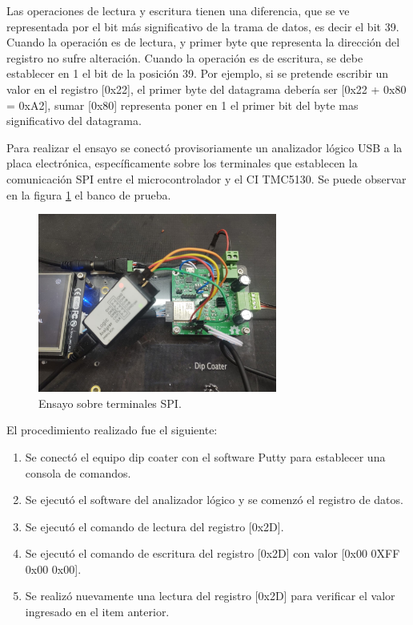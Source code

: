 Las operaciones de lectura y escritura tienen una diferencia, que se ve representada por el bit más significativo de la trama de datos, es decir el bit 39. Cuando la operación es de lectura, y primer byte que representa la dirección del registro no sufre alteración. Cuando la operación es de escritura, se debe establecer en 1 el bit de la posición 39. Por ejemplo, si  se pretende escribir un valor en el registro [0x22], el primer byte del datagrama debería ser [0x22 + 0x80 = 0xA2],  sumar [0x80] representa poner en 1 el primer bit del byte mas significativo del datagrama. 


Para realizar el ensayo se conectó provisoriamente un analizador lógico USB a la placa electrónica, específicamente sobre los terminales que establecen la comunicación SPI entre el microcontrolador y el CI TMC5130. Se puede observar en la figura \ref{fig:ensayo_spi} el banco de prueba.

\begin{figure}[h]
\centering 
\includegraphics[width=0.7\textwidth]{./Figures/ensayo_spi.jpeg}
\caption{Ensayo sobre terminales SPI.}
\label{fig:ensayo_spi}
\end{figure}

El procedimiento realizado fue el siguiente:
\begin{enumerate}
\item Se conectó el equipo dip coater con el software Putty para establecer una consola de comandos.
\item Se ejecutó el software del analizador lógico y se comenzó el registro de datos.
\item Se ejecutó el comando de lectura del registro [0x2D].
\item Se ejecutó el comando de escritura del registro [0x2D] con valor [0x00 0XFF 0x00 0x00].
\item Se realizó nuevamente una lectura del registro [0x2D] para verificar el valor ingresado en el item anterior. 
\end{enumerate}


